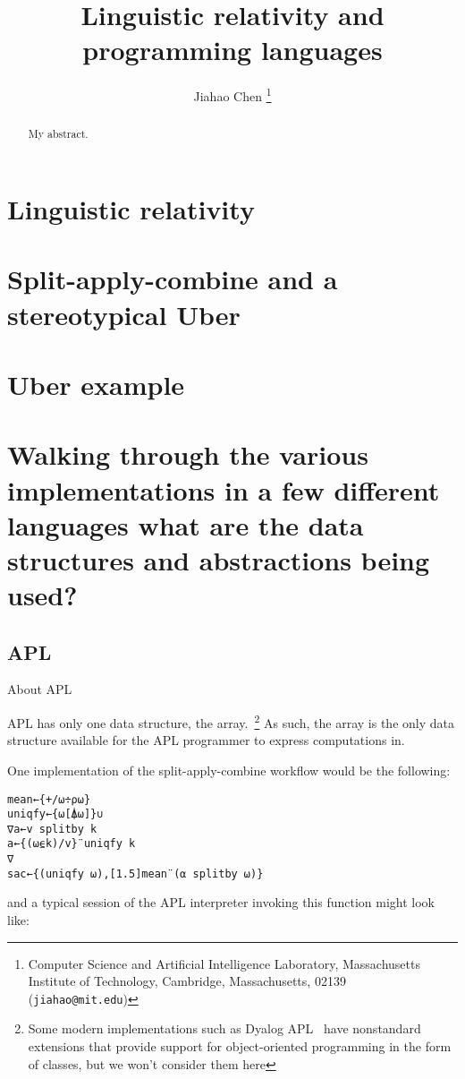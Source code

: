 \documentclass{article}
\title{Linguistic relativity and programming languages}
\author{%
    Jiahao Chen
    \thanks{Computer Science and Artificial Intelligence Laboratory,
           Massachusetts Institute of Technology,
           Cambridge, Massachusetts, 02139 ({\tt jiahao@mit.edu})}
}
\begin{document}
\maketitle

\begin{abstract}
My abstract.
\end{abstract}

\listoftodos

\section{Linguistic relativity}

\section{Split-apply-combine and a stereotypical Uber}

\section{Uber example}

\section{Walking through the various implementations in a few different languages
what are the data structures and abstractions being used?}

\subsection{APL}

About APL

APL has only one data structure, the array.~\footnote{Some modern implementations such as Dyalog APL~\cite{dyalog15} have nonstandard extensions that provide support for object-oriented programming in the form of classes, but we won't consider them here} As such, the array is the only data structure available for the APL programmer to express computations in.

One implementation of the split-apply-combine workflow would be the following:

\begin{lstlisting}
mean←{+/⍵÷⍴⍵}
uniqfy←{⍵[⍋⍵]}∪
∇a←v splitby k
a←{(⍵⍷k)/v}¨uniqfy k
∇
sac←{(uniqfy ⍵),[1.5]mean¨(⍺ splitby ⍵)}
\end{lstlisting}
%
and a typical session of the APL interpreter invoking this function might look like:
\end{document}
